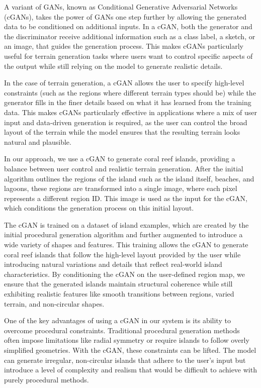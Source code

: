A variant of GANs, known as Conditional Generative Adversarial Networks (cGANs), takes the power of GANs one step further by allowing the generated data to be conditioned on additional inputs. In a cGAN, both the generator and the discriminator receive additional information such as a class label, a sketch, or an image, that guides the generation process. This makes cGANs particularly useful for terrain generation tasks where users want to control specific aspects of the output while still relying on the model to generate realistic details.

In the case of terrain generation, a cGAN allows the user to specify high-level constraints (such as the regions where different terrain types should be) while the generator fills in the finer details based on what it has learned from the training data. This makes cGANs particularly effective in applications where a mix of user input and data-driven generation is required, as the user can control the broad layout of the terrain while the model ensures that the resulting terrain looks natural and plausible.

In our approach, we use a cGAN to generate coral reef islands, providing a balance between user control and realistic terrain generation. After the initial algorithm outlines the regions of the island such as the island itself, beaches, and lagoons, these regions are transformed into a single image, where each pixel represents a different region ID. This image is used as the input for the cGAN, which conditions the generation process on this initial layout.


The cGAN is trained on a dataset of island examples, which are created by the initial procedural generation algorithm and further augmented to introduce a wide variety of shapes and features. This training allows the cGAN to generate coral reef islands that follow the high-level layout provided by the user while introducing natural variations and details that reflect real-world island characteristics. By conditioning the cGAN on the user-defined region map, we ensure that the generated islands maintain structural coherence while still exhibiting realistic features like smooth transitions between regions, varied terrain, and non-circular shapes.

One of the key advantages of using a cGAN in our system is its ability to overcome procedural constraints. Traditional procedural generation methods often impose limitations like radial symmetry or require islands to follow overly simplified geometries. With the cGAN, these constraints can be lifted. The model can generate irregular, non-circular islands that adhere to the user's input but introduce a level of complexity and realism that would be difficult to achieve with purely procedural methods.

